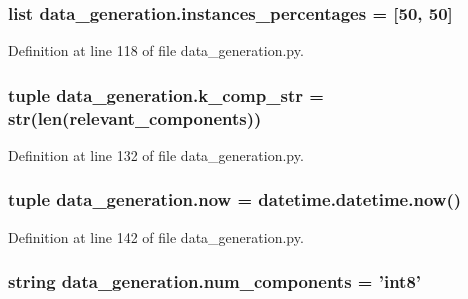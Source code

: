 \hypertarget{namespacedata__generation_a1c4e107080b11e6ef67edd30bfb93b05}{
\subsubsection[{instances\+\_\+percentages}]{\setlength{\rightskip}{0pt plus 5cm}list data\+\_\+generation.\+instances\+\_\+percentages = \mbox{[}50, 50\mbox{]}}}\label{namespacedata__generation_a1c4e107080b11e6ef67edd30bfb93b05}


Definition at line 118 of file data\+\_\+generation.\+py.

\hypertarget{namespacedata__generation_a0750f715835d704f388842c370b48499}{
\subsubsection[{k\+\_\+comp\+\_\+str}]{\setlength{\rightskip}{0pt plus 5cm}tuple data\+\_\+generation.\+k\+\_\+comp\+\_\+str = str(len({\bf relevant\+\_\+components}))}}\label{namespacedata__generation_a0750f715835d704f388842c370b48499}


Definition at line 132 of file data\+\_\+generation.\+py.

\hypertarget{namespacedata__generation_a4f08e445af07b6a8af849d8fd67dfbc9}{
\subsubsection[{now}]{\setlength{\rightskip}{0pt plus 5cm}tuple data\+\_\+generation.\+now = datetime.\+datetime.\+now()}}\label{namespacedata__generation_a4f08e445af07b6a8af849d8fd67dfbc9}


Definition at line 142 of file data\+\_\+generation.\+py.

\hypertarget{namespacedata__generation_a577eb8996c6d5ddad4042ac0552f5aaa}{
\subsubsection[{num\+\_\+components}]{\setlength{\rightskip}{0pt plus 5cm}string data\+\_\+generation.\+num\+\_\+components = 'int8'}}\label{namespacedata__generation_a577eb8996c6d5ddad4042ac0552f5aaa}



